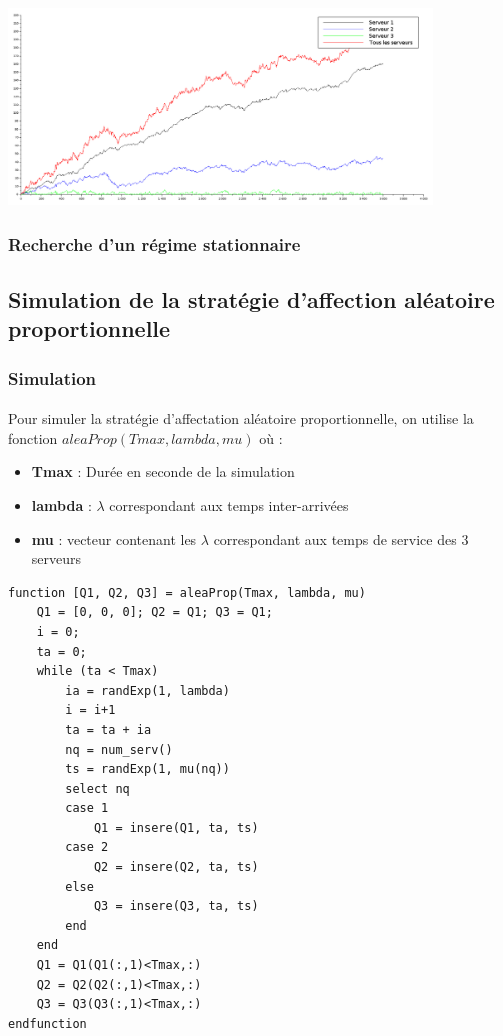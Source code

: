 \documentclass{article}
\begin{document}
\begin{center}
	\includegraphics[width=425px]{img/tls.png}
\end{center}

\subsubsection{Recherche d'un régime stationnaire}

\subsection{Simulation de la stratégie d'affection aléatoire proportionnelle}
\subsubsection{Simulation}

\paragraph{}
Pour simuler la stratégie d'affectation aléatoire proportionnelle, on utilise la fonction $aleaProp(Tmax,lambda,mu)$ où :
\begin{itemize}
	\item \textbf{Tmax} : Durée en seconde de la simulation
	\item \textbf{lambda} : $\lambda$ correspondant aux temps inter-arrivées
	\item \textbf{mu} : vecteur contenant les $\lambda$ correspondant aux temps de service des 3 serveurs
\end{itemize}
\begin{verbatim}
function [Q1, Q2, Q3] = aleaProp(Tmax, lambda, mu)
    Q1 = [0, 0, 0]; Q2 = Q1; Q3 = Q1;
    i = 0;
    ta = 0;
    while (ta < Tmax)
        ia = randExp(1, lambda)
        i = i+1
        ta = ta + ia 
        nq = num_serv() 
        ts = randExp(1, mu(nq))
        select nq
        case 1
            Q1 = insere(Q1, ta, ts)
        case 2 
            Q2 = insere(Q2, ta, ts)
        else
            Q3 = insere(Q3, ta, ts)
        end
    end
    Q1 = Q1(Q1(:,1)<Tmax,:)
    Q2 = Q2(Q2(:,1)<Tmax,:) 
    Q3 = Q3(Q3(:,1)<Tmax,:) 
endfunction 
\end{verbatim}
\end{document}
